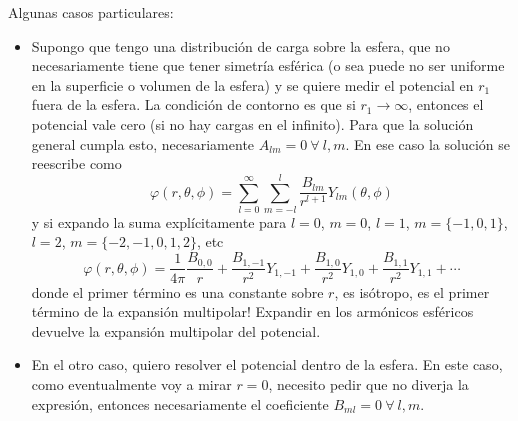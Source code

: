 \indent Algunas casos particulares: 
\begin{itemize}
    \item Supongo que tengo una distribución de carga sobre la esfera, que no necesariamente tiene que tener simetría esférica (o sea puede no ser uniforme en la superficie o volumen de la esfera) y se quiere medir el potencial en $r_{1}$ fuera de la esfera. La condición de contorno es que si $r_{1}\to \infty$, entonces el potencial vale cero (si no hay cargas en el infinito). Para que la solución general cumpla esto, necesariamente $A_{lm} = 0\ \forall\ l,m$. En ese caso la solución se reescribe como
    \begin{equation*}
        \varphi(r,\theta,\phi) = 
        \sum\limits_{l = 0}^{\infty}
        \sum\limits_{m = -l}^{l}
        \frac{B_{lm}}{r^{l+1}}
        Y_{lm}(\theta,\phi)
    \end{equation*}
    y si expando la suma explícitamente para $l = 0$, $m = 0$, $l = 1$, $m = \{-1,0,1\}$, $l = 2$, $m = \{-2,-1,0,1,2\}$, etc
    \begin{equation*}
        \varphi(r, \theta, \phi) = 
        \frac{1}{4\pi}\frac{B_{0,0}}{r} +
        \frac{B_{1,-1}}{r^{2}}Y_{1,-1} +
        \frac{B_{1,0}}{r^{2}}Y_{1,0} +
        \frac{B_{1,1}}{r^{2}}Y_{1,1} +
        \cdots
    \end{equation*}
    donde el primer término es una constante sobre $r$, es isótropo, es el primer término de la expansión multipolar! Expandir en los armónicos esféricos devuelve la expansión multipolar del potencial.
    \item En el otro caso, quiero resolver el potencial dentro de la esfera. En este caso, como eventualmente voy a mirar $r=0$, necesito pedir que no diverja la expresión, entonces necesariamente el coeficiente $B_{ml} = 0\ \forall\ l,m$.
\end{itemize}




